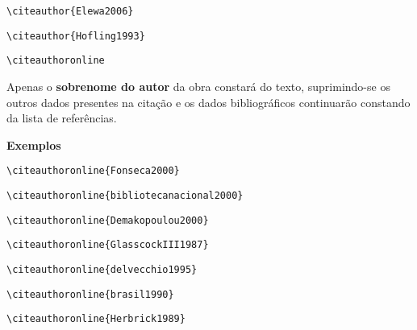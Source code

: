 \begin{alineas}
\begin{verbatim}
\citeauthor{Elewa2006}
\end{verbatim}
\citeauthor{Elewa2006}

\begin{verbatim}
\citeauthor{Hofling1993}
\end{verbatim}
\citeauthor{Hofling1993}


\item
\begin{verbatim}
\citeauthoronline
\end{verbatim}

Apenas o \textbf{sobrenome do autor} da obra constará do texto, suprimindo-se os outros dados presentes na citação e os dados bibliográficos continuarão constando da lista de referências.

\textbf{Exemplos}

\begin{verbatim}
\citeauthoronline{Fonseca2000}
\end{verbatim}

\begin{verbatim}
\citeauthoronline{bibliotecanacional2000}
\end{verbatim}

\begin{verbatim}
\citeauthoronline{Demakopoulou2000}
\end{verbatim}

\begin{verbatim}
\citeauthoronline{GlasscockIII1987}
\end{verbatim}

\begin{verbatim}
\citeauthoronline{delvecchio1995}
\end{verbatim}

\begin{verbatim}
\citeauthoronline{brasil1990}
\end{verbatim}

\begin{verbatim}
\citeauthoronline{Herbrick1989}
\end{verbatim}


\end{alineas}
